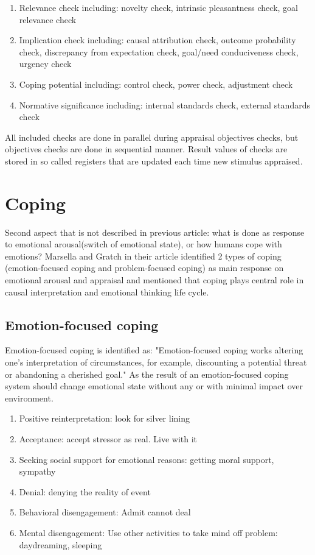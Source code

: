 \begin{enumerate}
 \item  Relevance check including: novelty check, intrinsic pleasantness check, goal relevance check
 \item  Implication check including: causal attribution check, outcome probability check, discrepancy from expectation check, goal/need conduciveness check, urgency check
 \item  Coping potential including: control check, power check, adjustment check
 \item  Normative significance including: internal standards check, external standards check
\end{enumerate}

All included checks are done in parallel during appraisal objectives checks, but objectives checks are done in sequential manner.
Result values of checks are stored in so called registers that are updated each time new stimulus appraised.

\section{Coping}

Second aspect that is not described in previous article: what is done as response to emotional arousal(switch of emotional state), or how humans cope with emotions?
Marsella and Gratch in their article \cite{dont_worry_be_happy} identified 2 types of coping (emotion-focused coping and problem-focused coping) as main response on emotional arousal and appraisal and mentioned that coping plays central role in causal interpretation and emotional thinking life cycle.

\subsection{Emotion-focused coping}

Emotion-focused coping is identified as: "Emotion-focused coping works altering one’s interpretation of circumstances, for example, discounting a potential threat or abandoning a cherished goal." As the result of an emotion-focused coping system should change emotional state without any or with minimal impact over environment.



\begin{enumerate}
 \item  Positive reinterpretation: look for silver lining
 \item  Acceptance: accept stressor as real. Live with it
 \item  Seeking  social  support  for  emotional  reasons: getting moral support, sympathy
 \item  Denial: denying the reality of event
 \item  Behavioral disengagement: Admit cannot deal
 \item  Mental  disengagement:  Use  other  activities  to take mind off problem: daydreaming, sleeping
\end{enumerate}

